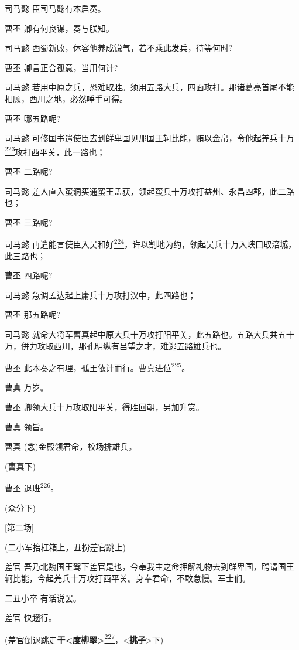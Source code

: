 司马懿 臣司马懿有本启奏。

曹丕 卿有何良谋，奏与朕知。

司马懿 西蜀新败，休容他养成锐气，若不乘此发兵，待等何时?

曹丕 卿言正合孤意，当用何计?

司马懿
若用中原之兵，恐难取胜。须用五路大兵，四面攻打。那诸葛亮首尾不能相顾，西川之地，必然唾手可得。

曹丕 哪五路呢?

司马懿
可修国书遣使臣去到鲜卑国见那国王轲比能，贿以金帛，令他起羌兵十万\protect\hyperlink{fn223}{\textsuperscript{223}}攻打西平关，此一路也；

曹丕 二路呢?

司马懿
差人直入蛮洞买通蛮王孟获，领起蛮兵十万攻打益州、永昌四郡，此二路也；

曹丕 三路呢?

司马懿
再遣能言使臣入吴和好\protect\hyperlink{fn224}{\textsuperscript{224}}，许以割地为约，领起吴兵十万入峡口取涪城，此三路也；

曹丕 四路呢?

司马懿 急调孟达起上庸兵十万攻打汉中，此四路也；

曹丕 那五路呢?

司马懿
就命大将军曹真起中原大兵十万攻打阳平关，此五路也。五路大兵共五十万，併力攻取西川，那孔明纵有吕望之才，难逃五路雄兵也。

曹丕
此本奏之有理，孤王依计而行。曹真进位\protect\hyperlink{fn225}{\textsuperscript{225}}。

曹真 万岁。

曹丕 卿领大兵十万攻取阳平关，得胜回朝，另加升赏。

曹真 领旨。

曹真 (念)金殿领君命，校场排雄兵。

(曹真下)

曹丕 退班\protect\hyperlink{fn226}{\textsuperscript{226}}。

(众分下)

{[}第二场{]}

(二小军抬杠箱上，丑扮差官跳上)

差官
吾乃北魏国王驾下差官是也，今奉我主之命押解礼物去到鲜卑国，聘请国王轲比能，今起羌兵十万攻打西平关。身奉君命，不敢怠慢。军士们。

二丑小卒 有话说罢。

差官 快趱行。

(差官倒退跳走\textbf{干\textless{}度柳翠\textgreater{}}\protect\hyperlink{fn227}{\textsuperscript{227}}，\textless{}\textbf{挑子}\textgreater{}下)


